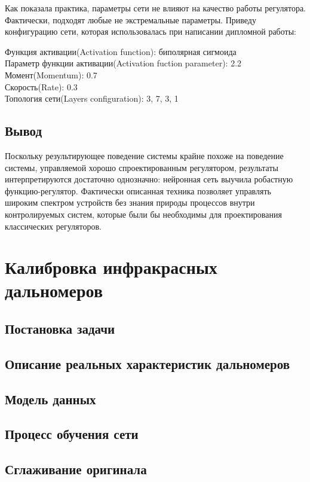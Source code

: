 \documentclass[14pt]{extreport}
\begin{document}
            Как показала практика, параметры сети не влияют на качество работы регулятора. Фактически, подходят любые не экстремальные параметры. Приведу конфигурацию сети, которая использовалась при написании дипломной работы:
                \begin{center}
                  Функция активации(Activation function): биполярная сигмоида\\
                  Параметр функции активации(Activation fuction parameter): 2.2\\
                  Момент(Momentum): 0.7\\
                  Скорость(Rate): 0.3\\
                  Топология сети(Layers configuration): 3, 7, 3, 1
                \end{center}
        \section{Вывод}
            Поскольку результирующее поведение системы крайне похоже на поведение системы, управляемой хорошо спроектированным регулятором, результаты интерпретируются достаточно однозначно: нейронная сеть выучила робастную функцию-регулятор. Фактически описанная техника позволяет управлять широким спектром устройств без знания природы процессов внутри контролируемых систем, которые были бы необходимы для проектирования классических регуляторов.
    \chapter{Калибровка инфракрасных дальномеров}
        \section{Постановка задачи}
        \section{Описание реальных характеристик дальномеров}
        \section{Модель данных}
        \section{Процесс обучения сети}
        \section{Сглаживание оригинала}
\end{document}
